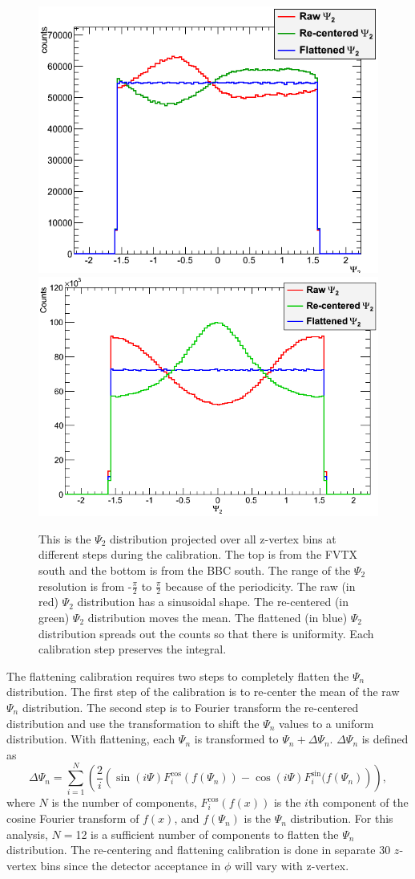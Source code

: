 \begin{figure}[!h]
\centering
\includegraphics[width=0.65\linewidth]{figs/flattened_example_fvtx.png}
\includegraphics[width=0.62\linewidth]{figs/flattened_example_bbc.png}
\caption{This is the $\Psi_2$ distribution projected over all z-vertex bins at different steps during the calibration. The top is from the FVTX south and the bottom is from the BBC south. The range of the $\Psi_2$ resolution is from -$\frac{\pi}{2}$ to $\frac{\pi}{2}$ because of the periodicity. The raw (in red) $\Psi_2$ distribution has a sinusoidal shape. The re-centered (in green) $\Psi_2$ distribution moves the mean. The flattened (in blue) $\Psi_2$ distribution spreads out the counts so that there is uniformity. Each calibration step preserves the integral.}
\label{fig:calibrated_psi}
\end{figure}

The flattening calibration requires two steps to completely flatten the $\Psi_n$ distribution. The first step of the calibration is to re-center the mean of the raw $\Psi_n$ distribution. The second step is to Fourier transform the re-centered distribution and use the transformation to shift the $\Psi_n$ values to a uniform distribution. With flattening, each $\Psi_n$ is transformed to $\Psi_n + \Delta\Psi_n$. $\Delta\Psi_n$ is defined as
\begin{equation}
\Delta\Psi_n = \sum^{N}_{i=1}\left(\frac{2}{i}\left(\sin(i \Psi)F^{\cos}_{i}(f(\Psi_n))-\cos(i \Psi)F^{\sin}_{i}(f(\Psi_n)\right)\right),
\label{eq:deltapsi}
\end{equation}
where $N$ is the number of components, $F^{\cos}_{i}(f(x))$ is the $i$th component of the cosine Fourier transform of $f(x)$, and $f(\Psi_n)$ is the $\Psi_n$ distribution. For this analysis, $N = $12 is a sufficient number of components to flatten the $\Psi_n$ distribution. The re-centering and flattening calibration is done in separate 30 $z$-vertex bins since the detector acceptance in $\phi$ will vary with z-vertex.

